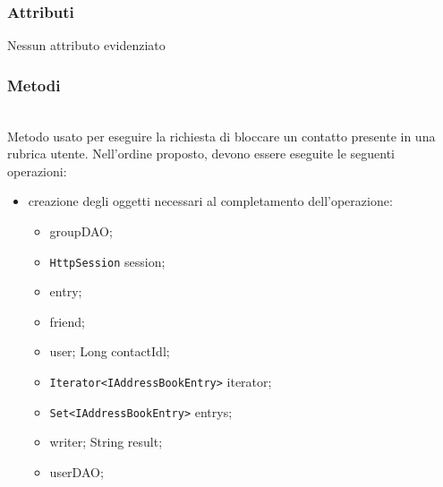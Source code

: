 \subsubsection*{Attributi}

Nessun attributo evidenziato


\subsubsection*{Metodi}

\begin{description}
	\item{}\\	
	Metodo usato per eseguire la richiesta di bloccare un contatto presente in una rubrica utente. Nell'ordine proposto, devono essere eseguite le seguenti operazioni:
	\begin{itemize}
		\item creazione degli oggetti necessari al completamento dell'operazione:
		\begin{itemize}
			\item {} groupDAO;
			\item \texttt{HttpSession} session;
			\item {} entry;
			\item {} friend;
			\item {} user;
			Long contactIdl;
			\item \texttt{Iterator<IAddressBookEntry>} iterator;
			\item \texttt{Set<IAddressBookEntry>} entrys;
			\item {} writer;
			String result;
			\item {} userDAO;
		\end{itemize}
		

\end{itemize}
\end{description}
